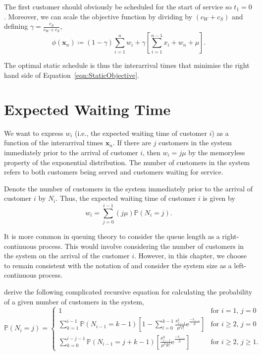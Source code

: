 The first customer should obviously be scheduled for the start of service so $t_{1} = 0$. Moreover, we can scale the objective function by dividing by $(c_{W} + c_{S})$ and defining $\gamma = \frac{c_{S}}{c_{W} + c_{S}}$,
\begin{equation}
	\phi (\mathbf{x}_{n}) \coloneqq (1 - \gamma) \sum_{i = 1}^{n} w_{i} + \gamma \left[ \sum_{i = 1}^{n - 1} x_{i} + w_{n} + \mu \right].
	\label{eqn:StaticObjective}
\end{equation}

The optimal static schedule is thus the interarrival times that minimise the right hand side of Equation~\ref{eqn:StaticObjective}.

\section{Expected Waiting Time}
We want to express $w_{i}$ (i.e., the expected waiting time of customer $i$) as a function of the interarrival times $\mathbf{x}_{n}$. If there are $j$ customers in the system immediately prior to the arrival of customer $i$, then $w_{i} = j \mu$ by the memoryless property of the exponential distribution. The number of customers in the system refers to both customers being served and customers waiting for service.

Denote the number of customers in the system immediately prior to the arrival of customer $i$ by $N_{i}$. Thus, the expected waiting time of customer $i$ is given by
\begin{equation}
	w_{i} = \sum_{j = 0}^{i - 1} (j \mu) \mathbb{P} (N_{i} = j).
\end{equation}

It is more common in queuing theory to consider the queue length as a right-continuous process. This would involve considering the number of customers in the system on the arrival of the customer $i$. However, in this chapter, we choose to remain consistent with the notation of \citet{Pegden} and consider the system size as a left-continuous process.

\citet{Pegden} derive the following complicated recursive equation for calculating the probability of a given number of customers in the system,
\begin{equation}
	\mathbb{P} (N_{i} = j) = \begin{cases} 1 & \text{for $i = 1$, $j = 0$} \\
	\sum_{k = 1}^{i - 1} \mathbb{P} (N_{i - 1} = k - 1) \left[ 1 - \sum_{l = 0}^{k - 1} \frac{x_{i - 1}^{l}}{\mu^{l} l!} \mathrm{e}^{\frac{- x_{i - 1}}{\mu}}\right] & \text{for $i \geq 2$, $j = 0$} \\
	\sum_{k = 0}^{i - j - 1} \mathbb{P} (N_{i - 1} = j + k - 1) \left[ \frac{x_{i - 1}^{k}}{\mu^{k} k!} \mathrm{e}^{\frac{- x_{i - 1}}{\mu}} \right] & \text{for $i \geq 2$, $j \geq 1$}. \end{cases}
	\label{eqn:StaticProbSystem}
\end{equation}

